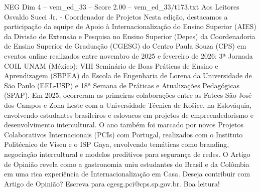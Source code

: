 \begin{textsample}{NEG Dim 4 – vem\_ed\_33 – Score 2.00 – vem\_ed\_33/t173.txt}  \label{ex:f4_neg_040}
Aos Leitores Osvaldo Succi Jr. - Coordenador de Projetos Nesta edição, destacamos a participação da equipe de Apoio à Internacionalização do Ensino Superior (AIES) da Divisão de Extensão e Pesquisa no Ensino Superior (Depes) da Coordenadoria de Ensino Superior de Graduação (CGESG) do Centro Paula Souza (CPS) em eventos online realizados entre novembro de 2025 e fevereiro de 2026: 3ª Jornada COIL UNAM (México); VIII Seminário de Boas Práticas de Ensino e Aprendizagem (SBPEA) da Escola de Engenharia de Lorena da Universidade de São Paulo (EEL-USP) e 18ª Semana de Práticas e Atualizações Pedagógicas (SPAP).
Em 2025, ocorreram as primeiras colaborações entre as Fatecs São José dos Campos e Zona Leste com a Universidade Técnica de Košice, na Eslováquia, envolvendo estudantes brasileiros e eslovacos em projetos de empreendedorismo e desenvolvimento intercultural.
O ano também foi marcado por novos Projetos Colaborativos Internacionais (PCIs) com Portugal, realizados com o Instituto Politécnico de Viseu e o ISP Gaya, envolvendo temáticas como branding, negociação intercultural e modelos preditivos para segurança de redes.
O Artigo de Opinião revela como a gastronomia uniu estudantes do Brasil e da Colômbia em uma rica experiência de Internacionalização em Casa.
Deseja contribuir com Artigo de Opinião?
Escreva para cgesg.pci@cps.sp.gov.br.
Boa leitura!

\end{textsample}
